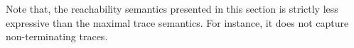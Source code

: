 Note that, the reachability semantics presented in this section is strictly less expressive than the maximal trace semantics. For instance, it does not capture non-terminating traces.


